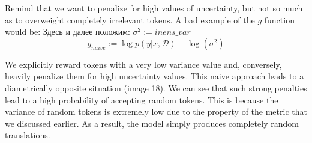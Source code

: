 \documentclass[a4paper,14pt]{extarticle}
\begin{document}
	\begin{figure}[t]
	\end{figure} 
	
	Remind that we want to penalize for high values of uncertainty, but not so much as to overweight completely irrelevant tokens. A bad example of the $g$ function would be:
	Здесь и далее положим: $\sigma^2 := inens\_var$
	\begin{equation}
		g_{naive} := \log p(y | x, \mathcal{D}) - \log(\sigma^2)
	\end{equation}
	
	We explicitly reward tokens with a very low variance value and, conversely, heavily penalize them for high uncertainty values. This naive approach leads to a diametrically opposite situation (image 18). We can see that such strong penalties lead to a high probability of accepting random tokens. This is because the variance of random tokens is extremely low due to the property of the metric that we discussed earlier. As a result, the model simply produces completely random translations.
	
	\begin{figure}[t]
	\end{figure}
	
\end{document}
